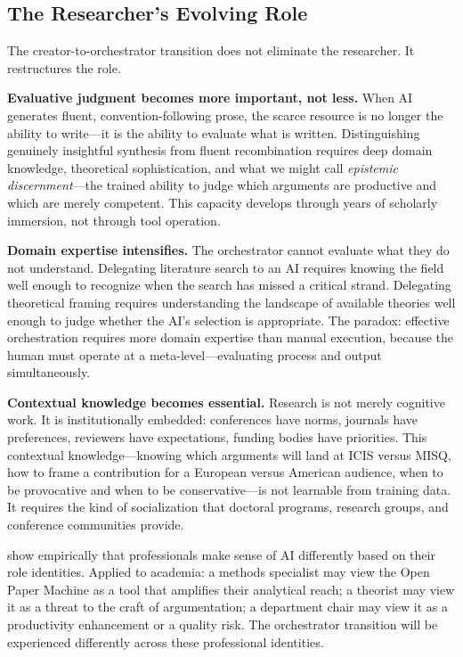 \documentclass{article}
\begin{document}
\subsection{The Researcher's Evolving Role}

The creator-to-orchestrator transition does not eliminate the researcher. It restructures the role.

\textbf{Evaluative judgment becomes more important, not less.} When AI generates fluent, convention-following prose, the scarce resource is no longer the ability to write---it is the ability to evaluate what is written. Distinguishing genuinely insightful synthesis from fluent recombination requires deep domain knowledge, theoretical sophistication, and what we might call \textit{epistemic discernment}---the trained ability to judge which arguments are productive and which are merely competent. This capacity develops through years of scholarly immersion, not through tool operation.

\textbf{Domain expertise intensifies.} The orchestrator cannot evaluate what they do not understand. Delegating literature search to an AI requires knowing the field well enough to recognize when the search has missed a critical strand. Delegating theoretical framing requires understanding the landscape of available theories well enough to judge whether the AI's selection is appropriate. The paradox: effective orchestration requires more domain expertise than manual execution, because the human must operate at a meta-level---evaluating process and output simultaneously.

\textbf{Contextual knowledge becomes essential.} Research is not merely cognitive work. It is institutionally embedded: conferences have norms, journals have preferences, reviewers have expectations, funding bodies have priorities. This contextual knowledge---knowing which arguments will land at ICIS versus MISQ, how to frame a contribution for a European versus American audience, when to be provocative and when to be conservative---is not learnable from training data. It requires the kind of socialization that doctoral programs, research groups, and conference communities provide.

\citet{scarbrough2024epistemic} show empirically that professionals make sense of AI differently based on their role identities. Applied to academia: a methods specialist may view the Open Paper Machine as a tool that amplifies their analytical reach; a theorist may view it as a threat to the craft of argumentation; a department chair may view it as a productivity enhancement or a quality risk. The orchestrator transition will be experienced differently across these professional identities.
\end{document}
